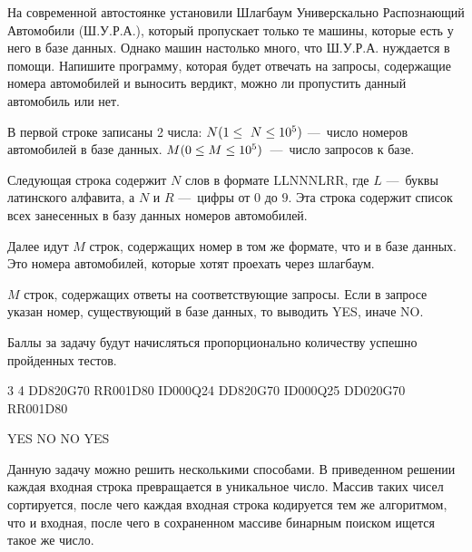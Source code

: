 
На современной автостоянке установили Шлагбаум Универскально Распознающий Автомобили (Ш.У.Р.А.), который пропускает только те машины, которые есть у него в базе данных. Однако машин настолько много, что Ш.У.Р.А. нуждается в помощи. Напишите программу, которая будет отвечать на запросы, содержащие номера автомобилей и выносить вердикт, можно ли пропустить данный автомобиль или нет.


В первой строке записаны 2 числа:
$N\space (1 \leq N \leq 10^5)$ — число номеров автомобилей в базе данных.
$M\space (0 \leq M \leq 10^5)$ — число запросов к базе.

Следующая строка содержит $N$ слов в формате LLNNNLRR, где $L$ — буквы латинского алфавита, а $N$ и $R$ — цифры от $0$ до $9$. Эта строка содержит список всех занесенных в базу данных номеров автомобилей.

Далее идут $M$ строк, содержащих номер в том же формате, что и в базе данных. Это номера автомобилей, которые хотят проехать через шлагбаум.

\outputfmtSection

$M$ строк, содержащих ответы на соответствующие запросы. Если в запросе указан номер, существующий в базе данных, то выводить YES, иначе NO.

\markSection

Баллы за задачу будут начисляться пропорционально количеству успешно пройденных тестов.


\begin{myverbbox}[\small]{\vinput}
    3 4
    DD820G70 RR001D80 ID000Q24
    DD820G70
    ID000Q25
    DD020G70
    RR001D80
\end{myverbbox}
\begin{myverbbox}[\small]{\voutput}
    YES
    NO
    NO
    YES
\end{myverbbox}

\solutionSection

Данную задачу можно решить несколькими способами. В приведенном решении каждая входная строка превращается в уникальное число. Массив таких чисел сортируется, после чего каждая входная строка кодируется тем же алгоритмом, что и входная, после чего в сохраненном массиве бинарным поиском ищется такое же число.

